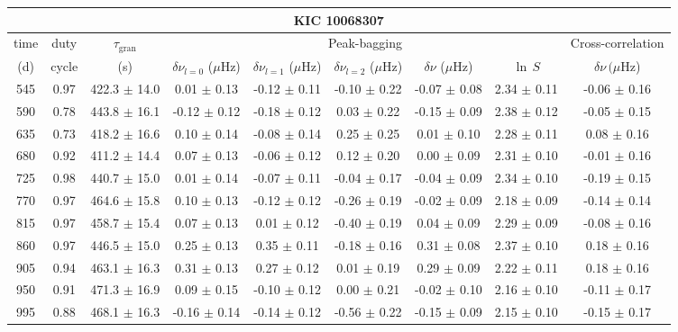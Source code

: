 \documentclass[twocolumn]{aastex61}%
\begin{document}
\begin{table*}[ht]\centering\fontsize{9.}{7.}\selectfont
\begin{tabular}{ccc|ccccc|c}
\multicolumn{9}{c}{KIC 10068307}\\ \hline\hline
time & duty & $\tau_\text{gran}$ &\multicolumn{5}{c|}{Peak-bagging}&Cross-correlation\\
(d)& cycle & (s)&$\delta\nu_{l=0}$ ($\mu$Hz) & $\delta\nu_{l=1}$ ($\mu$Hz) & $\delta\nu_{l=2}$ ($\mu$Hz) & $\delta\nu$ ($\mu$Hz)& $\ln\,S$ & $\delta\nu\,(\mu$Hz)\\\hline
545 & 0.97 & 422.3 $\pm$ 14.0 & 0.01 $\pm$ 0.13 & -0.12 $\pm$ 0.11 & -0.10 $\pm$ 0.22 & -0.07 $\pm$ 0.08 & 2.34 $\pm$ 0.11 & -0.06 $\pm$ 0.16\\
590 & 0.78 & 443.8 $\pm$ 16.1 & -0.12 $\pm$ 0.12 & -0.18 $\pm$ 0.12 & 0.03 $\pm$ 0.22 & -0.15 $\pm$ 0.09 & 2.38 $\pm$ 0.12 & -0.05 $\pm$ 0.15\\
635 & 0.73 & 418.2 $\pm$ 16.6 & 0.10 $\pm$ 0.14 & -0.08 $\pm$ 0.14 & 0.25 $\pm$ 0.25 & 0.01 $\pm$ 0.10 & 2.28 $\pm$ 0.11 & 0.08 $\pm$ 0.16\\
680 & 0.92 & 411.2 $\pm$ 14.4 & 0.07 $\pm$ 0.13 & -0.06 $\pm$ 0.12 & 0.12 $\pm$ 0.20 & 0.00 $\pm$ 0.09 & 2.31 $\pm$ 0.10 & -0.01 $\pm$ 0.16\\
725 & 0.98 & 440.7 $\pm$ 15.0 & 0.01 $\pm$ 0.14 & -0.07 $\pm$ 0.11 & -0.04 $\pm$ 0.17 & -0.04 $\pm$ 0.09 & 2.34 $\pm$ 0.10 & -0.19 $\pm$ 0.15\\
770 & 0.97 & 464.6 $\pm$ 15.8 & 0.10 $\pm$ 0.13 & -0.12 $\pm$ 0.12 & -0.26 $\pm$ 0.19 & -0.02 $\pm$ 0.09 & 2.18 $\pm$ 0.09 & -0.14 $\pm$ 0.14\\
815 & 0.97 & 458.7 $\pm$ 15.4 & 0.07 $\pm$ 0.13 & 0.01 $\pm$ 0.12 & -0.40 $\pm$ 0.19 & 0.04 $\pm$ 0.09 & 2.29 $\pm$ 0.09 & -0.08 $\pm$ 0.16\\
860 & 0.97 & 446.5 $\pm$ 15.0 & 0.25 $\pm$ 0.13 & 0.35 $\pm$ 0.11 & -0.18 $\pm$ 0.16 & 0.31 $\pm$ 0.08 & 2.37 $\pm$ 0.10 & 0.18 $\pm$ 0.16\\
905 & 0.94 & 463.1 $\pm$ 16.3 & 0.31 $\pm$ 0.13 & 0.27 $\pm$ 0.12 & 0.01 $\pm$ 0.19 & 0.29 $\pm$ 0.09 & 2.22 $\pm$ 0.11 & 0.18 $\pm$ 0.16\\
950 & 0.91 & 471.3 $\pm$ 16.9 & 0.09 $\pm$ 0.15 & -0.10 $\pm$ 0.12 & 0.00 $\pm$ 0.21 & -0.02 $\pm$ 0.10 & 2.16 $\pm$ 0.10 & -0.11 $\pm$ 0.17\\
995 & 0.88 & 468.1 $\pm$ 16.3 & -0.16 $\pm$ 0.14 & -0.14 $\pm$ 0.12 & -0.56 $\pm$ 0.22 & -0.15 $\pm$ 0.09 & 2.15 $\pm$ 0.10 & -0.15 $\pm$ 0.17\\

\end{tabular}
\end{table*}
\end{document}
